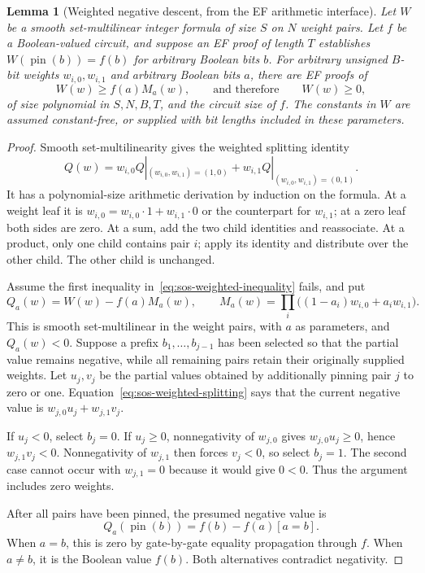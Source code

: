 \documentclass[11pt]{article}
\newtheorem{lemma}[theorem]{Lemma}
\theoremstyle{definition}
\theoremstyle{remark}
\begin{document}
\begin{lemma}[Weighted negative descent, from the EF arithmetic interface]
\label{lem:sos-weighted-descent}
Let $W$ be a smooth set-multilinear integer formula of size $S$ on
$N$ weight pairs.  Let $f$ be a Boolean-valued circuit, and suppose
an EF proof of length $T$ establishes
$W(\operatorname{pin}(b))=f(b)$ for arbitrary Boolean bits $b$.
For arbitrary unsigned $B$-bit weights $w_{i,0},w_{i,1}$ and
arbitrary Boolean bits $a$, there are EF proofs of
\[
 W(w)\ge f(a)M_a(w),
 \qquad\text{and therefore}\qquad W(w)\ge0,
 \tag{$\dagger$}\label{eq:sos-weighted-inequality}
\]
of size polynomial in $S,N,B,T$, and the circuit size of $f$.
The constants in $W$ are assumed constant-free, or supplied with
bit lengths included in these parameters.
\end{lemma}
\begin{proof}
Smooth set-multilinearity gives the weighted splitting identity
\[
 Q(w)=w_{i,0}Q|_{(w_{i,0},w_{i,1})=(1,0)}
      +w_{i,1}Q|_{(w_{i,0},w_{i,1})=(0,1)}.
 \tag{$\ddagger$}\label{eq:sos-weighted-splitting}
\]
It has a polynomial-size arithmetic derivation by induction on the
formula.  At a weight leaf it is $w_{i,0}=w_{i,0}\cdot1+w_{i,1}\cdot0$
or the counterpart for $w_{i,1}$; at a zero leaf both sides are zero.
At a sum, add the two child identities and reassociate.
At a product, only one child contains pair $i$; apply its identity
and distribute over the other child.  The other child is unchanged.

Assume the first inequality in~\eqref{eq:sos-weighted-inequality}
fails, and put
\[
 Q_a(w)=W(w)-f(a)M_a(w),\qquad
 M_a(w)=\prod_i\bigl((1-a_i)w_{i,0}+a_iw_{i,1}\bigr).
\]
This is smooth set-multilinear in the weight pairs, with $a$ as
parameters, and $Q_a(w)<0$.
Suppose a prefix $b_1,\ldots,b_{j-1}$ has been selected so that
the partial value remains negative, while all remaining pairs
retain their originally supplied weights.  Let $u_j,v_j$ be the
partial values obtained by additionally pinning pair $j$ to zero
or one.  Equation~\eqref{eq:sos-weighted-splitting} says that the
current negative value is $w_{j,0}u_j+w_{j,1}v_j$.

If $u_j<0$, select $b_j=0$.
If $u_j\ge0$, nonnegativity of $w_{j,0}$ gives
$w_{j,0}u_j\ge0$, hence $w_{j,1}v_j<0$.
Nonnegativity of $w_{j,1}$ then forces $v_j<0$, so select $b_j=1$.
The second case cannot occur with $w_{j,1}=0$ because it would
give $0<0$.  Thus the argument includes zero weights.

After all pairs have been pinned, the presumed negative value is
\[
 Q_a(\operatorname{pin}(b))=f(b)-f(a)[a=b].
\]
When $a=b$, this is zero by gate-by-gate equality propagation
through $f$.  When $a\ne b$, it is the Boolean value $f(b)$.
Both alternatives contradict negativity.


\end{proof}
\end{document}
